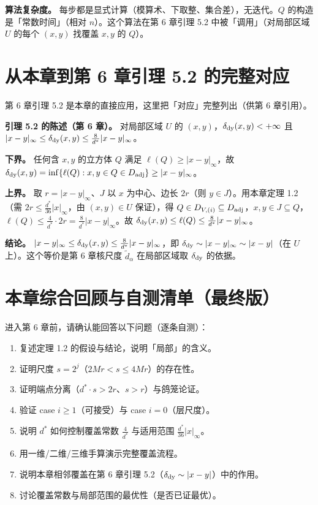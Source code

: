 \documentclass[a4paper,11pt,openany]{ctexbook}
\numberwithin{equation}{chapter}
\numberwithin{figure}{chapter}
\numberwithin{table}{chapter}
\begin{document}
\textbf{算法复杂度。} 每步都是显式计算（模算术、下取整、集合差），无迭代。$Q$ 的构造是「常数时间」（相对 $n$）。这个算法在第 6 章引理 5.2 中被「调用」（对局部区域 $U$ 的每个 $(x,y)$ 找覆盖 $x,y$ 的 $Q$）。

\section{从本章到第 6 章引理 5.2 的完整对应}

第 6 章引理 5.2 是本章的直接应用，这里把「对应」完整列出（供第 6 章引用）。

\textbf{引理 5.2 的陈述（第 6 章）。} 对局部区域 $U$ 的 $(x,y)$，$\delta_{\rm dy}(x,y)<+\infty$ 且 $|x-y|_\infty\le\delta_{\rm dy}(x,y)\le\frac8{d^*}|x-y|_\infty$。

\textbf{下界。} 任何含 $x,y$ 的立方体 $Q$ 满足 $\ell(Q)\ge|x-y|_\infty$，故 $\delta_{\rm dy}(x,y)=\inf\{\ell(Q):x,y\in Q\in D_{\rm adj}\}\ge|x-y|_\infty$。

\textbf{上界。} 取 $r=|x-y|_\infty$、$J$ 以 $x$ 为中心、边长 $2r$（则 $y\in J$）。用本章定理 1.2（需 $2r\le\frac{d^*}{36}|x|_\infty$，由 $(x,y)\in U$ 保证），得 $Q\in D_{V,(i)}\subseteq D_{\rm adj}$，$x,y\in J\subseteq Q$，$\ell(Q)\le\frac4{d^*}\cdot2r=\frac8{d^*}|x-y|_\infty$。故 $\delta_{\rm dy}(x,y)\le\ell(Q)\le\frac8{d^*}|x-y|_\infty$。

\textbf{结论。} $|x-y|_\infty\le\delta_{\rm dy}(x,y)\le\frac8{d^*}|x-y|_\infty$，即 $\delta_{\rm dy}\sim|x-y|_\infty\sim|x-y|$（在 $U$ 上）。这个等价是第 6 章核尺度 $\widetilde d_\alpha$ 在局部区域取 $\delta_{\rm dy}$ 的依据。

\section{本章综合回顾与自测清单（最终版）}

进入第 6 章前，请确认能回答以下问题（逐条自测）：

\begin{enumerate}
\item 复述定理 1.2 的假设与结论，说明「局部」的含义。
\item 证明尺度 $s=2^j$（$2Mr<s\le4Mr$）的存在性。
\item 证明端点分离（$d^*\cdot s>2r$、$s>r$）与鸽笼论证。
\item 验证 case $i\ge1$（可接受）与 case $i=0$（层尺度）。
\item 说明 $d^*$ 如何控制覆盖常数 $\frac4{d^*}$ 与适用范围 $\frac{d^*}{36}|x|_\infty$。
\item 用一维/二维/三维手算演示完整覆盖流程。
\item 说明本章相邻覆盖在第 6 章引理 5.2（$\delta_{\rm dy}\sim|x-y|$）中的作用。
\item 讨论覆盖常数与局部范围的最优性（是否已证最优）。
\end{enumerate}
\end{document}
